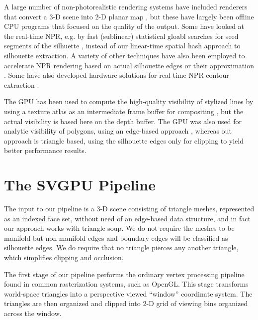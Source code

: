 \documentclass[review]{acmsiggraph}
\begin{document}
A large number of non-photorealistic rendering systems have included renderers
that convert a 3-D scene into 2-D planar map
\cite{winkenbach94,hertzmann2000,stroila2008,eisemann2008,eisemann2009,karsch2011},
but these have largely been offline CPU programs that focused on the quality
of the output. Some have looked at the real-time NPR, e.g. by fast (sublinear)
statistical gloabl searches for seed segments of the silhuette
\cite{markosian1997}, instead of our linear-time spatial hash approach to
silhouette extraction. A variety of other techniques have also been employed
to accelerate NPR rendering based on actual silhouette edges
\cite{buchanan2000,kim2005} or their approximation \cite{raskar1999}.
Some have also developed hardware solutions for real-time NPR contour
extraction \cite{raskar2001,ho2004,wang2005}.

The GPU has been used to compute the high-quality visibility of stylized lines
by using a texture atlas as an intermediate frame buffer for compositing
\cite{cole2009}, but the actual visibility is based here on the depth buffer.
The GPU was also used for analytic visibility of polygons, using an edge-based
approach \cite{auzinger2013}, whereas out approach is triangle based, using
the silhouette edges only for clipping to yield better performance results.




\section{The SVGPU Pipeline} \label{sec:svgpu}

The input to our pipeline is a 3-D scene consisting of triangle meshes,
represented as an indexed face set, without need of an edge-based data
structure, and in fact our approach works with triangle soup. We do not require
the meshes to be manifold but non-manifold edges and boundary edges will be
classified as silhouette edges.  We do require that no triangle pierces any
another triangle, which simplifies clipping and occlusion.

The first stage of our pipeline performs the ordinary vertex processing
pipeline found in common rasterization systems, such as OpenGL. This stage
transforms world-space triangles into a perspective viewed ``window''
coordinate system.  The triangles are then organized and clipped into 2-D grid
of viewing bins organized across the window.
\end{document}
